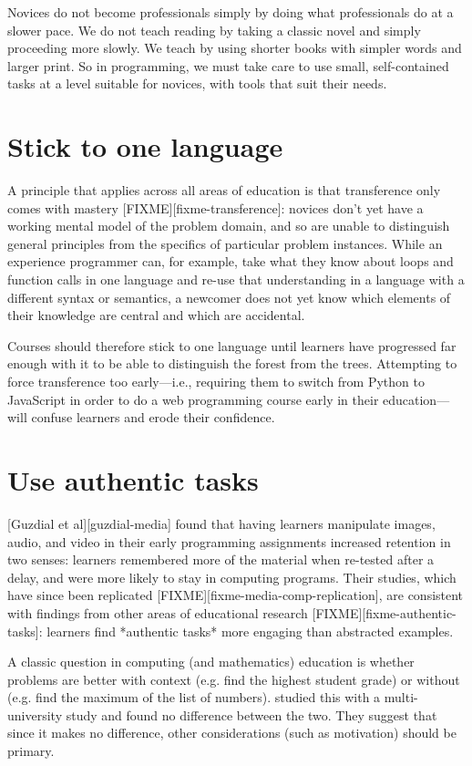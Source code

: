 \documentclass{article}
\begin{document}
Novices do not become professionals simply by doing what professionals do at a slower pace.  We do not teach reading by taking a classic novel and simply proceeding more slowly.  We teach by using shorter books with simpler words and larger print.  So in programming, we must take care to use small, self-contained tasks at a level suitable for novices, with tools that suit their needs.

\section{Stick to one language}

A principle that applies across all areas of education is that transference only comes with mastery [FIXME][fixme-transference]:
novices don't yet have a working mental model of the problem domain,
and so are unable to distinguish general principles from the specifics of particular problem instances.
While an experience programmer can,
for example,
take what they know about loops and function calls in one language
and re-use that understanding in a language with a different syntax or semantics,
a newcomer does not yet know which elements of their knowledge are central
and which are accidental.

Courses should therefore stick to one language until learners have progressed far enough with it
to be able to distinguish the forest from the trees.
Attempting to force transference too early---i.e.,
requiring them to switch from Python to JavaScript in order to do a web programming course
early in their education---will confuse learners and erode their confidence.

\section{Use authentic tasks}

[Guzdial et al][guzdial-media] found that having learners manipulate images, audio, and video
in their early programming assignments
increased retention in two senses:
learners remembered more of the material when re-tested after a delay,
and were more likely to stay in computing programs.
Their studies,
which have since been replicated [FIXME][fixme-media-comp-replication],
are consistent with findings from other areas of educational research [FIXME][fixme-authentic-tasks]:
learners find *authentic tasks* more engaging than abstracted examples.

A classic question in computing (and mathematics) education is whether problems are better 
with context (e.g. find the highest student grade) or without (e.g. find the maximum of the list of numbers).
\citet{bouvier-context} studied this with a multi-university study and found no difference between
the two.  They suggest that since it makes no difference, other considerations (such as motivation)
should be primary.
\end{document}
